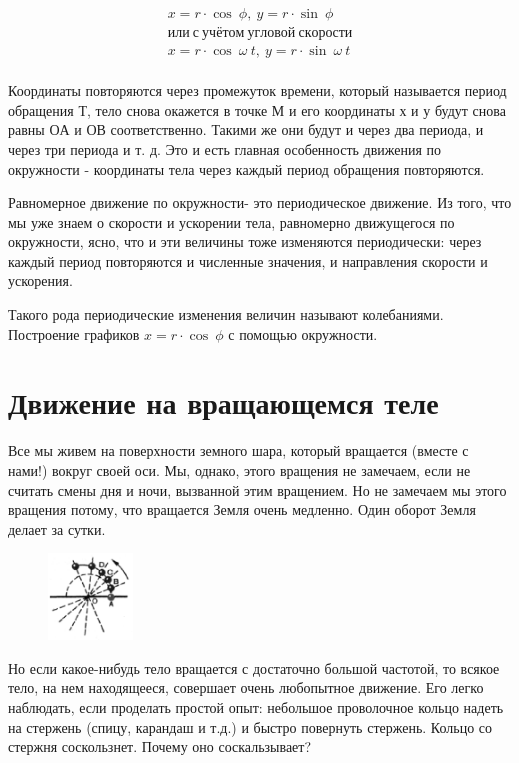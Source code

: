 \documentclass[a5paper, 10pt]{diss_4}
\renewcommand{\'}{\,'}
\begin{document}
\begin{gather*}
x=r\cdot\cos\ \phi,\ y=r\cdot\sin\ \phi\ \\
или\ с\ учётом\ угловой\ скорости\\
x=r\cdot\cos\ \omega\ t,\ y=r\cdot\sin\ \omega\ t \\
\end{gather*}

  Координаты повторяются через промежуток времени, который называется период
обращения $Т$, тело снова окажется в точке $М$ и его координаты $х$ и $у$ будут
 снова равны $ОА$ и $ОВ$ соответственно. Такими же они будут и через два
периода, и через три периода и т. д. Это и есть главная особенность движения
по окружности - координаты тела через каждый период обращения повторяются.

  Равномерное движение по окружности- это периодическое движение. Из
того, что мы уже знаем о скорости и ускорении тела, равномерно движущегося по
окружности, ясно, что и эти величины тоже изменяются периодически: через каждый
период повторяются и численные значения, и направления скорости и ускорения.

  Такого рода периодические изменения величин называют колебаниями.
Построение графиков $x=r\cdot\cos\ \phi$ с помощью окружности.

\section{Движение на вращающемся теле}

  Все мы живем на поверхности земного шара, который вращается (вместе с
нами!) вокруг своей оси. Мы, однако, этого вращения не замечаем, если не
считать смены дня и ночи, вызванной этим вращением. Но не замечаем мы этого
вращения потому, что вращается Земля очень медленно. Один оборот Земля делает
за сутки.

\begin{figure}
\includegraphics[width=0.2\textwidth]{img/img_24.eps}
\caption{}
\label{r65}
\end{figure}
  Но если какое-нибудь тело вращается с достаточно большой частотой, то
всякое тело, на нем находящееся, совершает очень любопытное движение. Его легко
наблюдать, если проделать простой опыт: небольшое проволочное кольцо надеть на
стержень (спицу, карандаш и т.д.) и быстро повернуть стержень. Кольцо со
стержня соскользнет. Почему оно соскальзывает?
\end{document}
